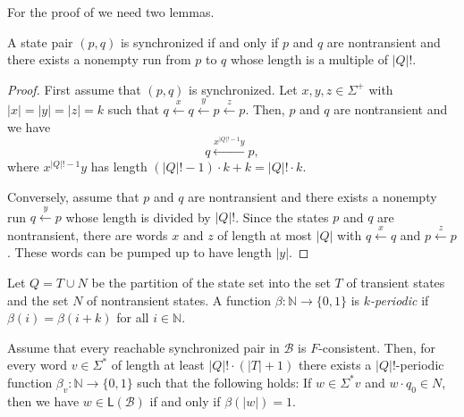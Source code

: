 \documentclass{article}\usepackage[a4paper,margin=20mm]{geometry}
\newcommand{\N}{\mathbb{N}}
\newcommand{\B}{\mathcal{B}}
\renewcommand{\L}{\mathsf{L}}
\begin{document}
For the proof of  we need two lemmas.

\begin{lemma}
	\label{lem:factorial-length}
	A state pair $(p,q)$ is synchronized
	if and only if $p$ and $q$ are nontransient
	and there exists a nonempty run from $p$ to $q$ whose 
	length is a multiple of $|Q|!$.
\end{lemma}

\begin{proof}
        First assume that $(p,q)$ is synchronized.
	Let $x,y,z\in\Sigma^+$ with $|x|=|y|=|z|=k$ such that
	$q \xleftarrow{x} q \xleftarrow{y} p \xleftarrow{z} p$.
	Then, $p$ and $q$ are nontransient and we have 
	\[  q \xleftarrow{x^{|Q|!-1}y} p, \]
	where $x^{|Q|!-1}y$ has length $(|Q|!-1) \cdot k + k = |Q|! \cdot k$.

	Conversely, assume that $p$ and $q$ are nontransient
	and there exists a nonempty run $q \xleftarrow{y} p$ whose length is divided by $|Q|!$.
	Since the states $p$ and $q$ are nontransient,
	there are words $x$ and $z$ of length at most $|Q|$ with
	$q \xleftarrow{x} q$ and $p \xleftarrow{z} p$.
	These words can be pumped up to have length $|y|$.
\end{proof}

Let $Q = T \cup N$ be the partition of the state set into the set $T$ of transient states and the set $N$ of nontransient states.
A function $\beta \colon \N \to \{0,1\}$ is {\em $k$-periodic} if $\beta(i) = \beta(i+k)$ for all $i \in \N$.

\begin{lemma}
	\label{lem:periodic}
	Assume that every reachable synchronized pair in $\B$ is $F$-consistent.
	Then, for every word $v \in \Sigma^*$ of length at least $|Q|! \cdot (|T|+1)$
	there exists a $|Q|!$-periodic function $\beta_v \colon \N \to \{0,1\}$ such that the following holds:
	If $w \in \Sigma^* v$ and $w \cdot q_0 \in N$, then we have
	$w \in \L(\B)$ if and only if $\beta(|w|) = 1$.
\end{lemma}
\end{document}
